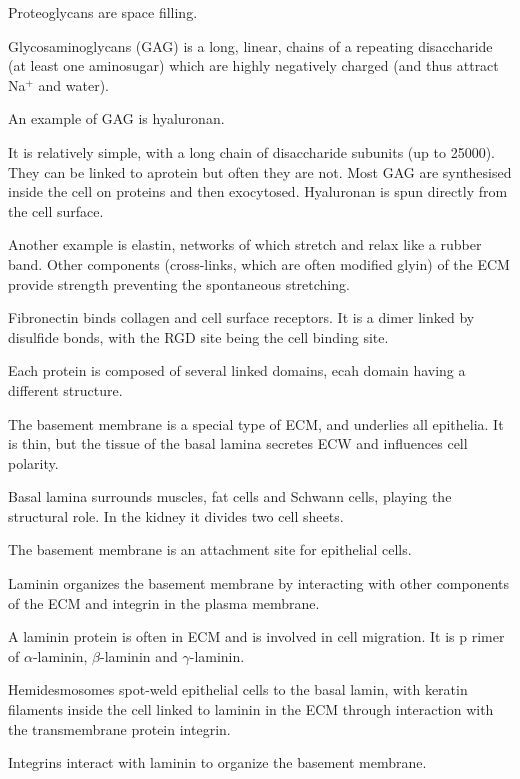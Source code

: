 \documentclass[11pt]{scrartcl}
\begin{document}
Proteoglycans are space filling. 

Glycosaminoglycans (GAG) is a long, linear, chains of a repeating
disaccharide (at least one aminosugar) which are highly negatively
charged (and thus attract Na$^+$ and water).

An example of GAG is hyaluronan. 

It is relatively simple, with a long chain of disaccharide subunits (up to 25000). They can be linked to aprotein but often they are not. Most GAG are synthesised inside the cell on proteins and then exocytosed. Hyaluronan is spun directly from the cell surface.

Another example is elastin, networks of which stretch and relax like a rubber band. Other components (cross-links, which are often modified glyin) of the ECM provide strength preventing the spontaneous stretching.

Fibronectin binds collagen and cell surface receptors. It is a dimer linked by disulfide bonds, with the RGD site being the cell binding site.

Each protein is composed of several linked domains, ecah domain having a different structure.

The basement membrane is a special type of ECM, and underlies all
epithelia. It is thin, but the tissue of the basal lamina secretes ECW
and influences cell polarity.

Basal lamina surrounds muscles, fat cells and Schwann cells, playing the structural role. In the kidney it divides two cell sheets.

The basement membrane is an attachment site for epithelial cells.

Laminin organizes the basement membrane by interacting with other
components of the ECM and integrin in the plasma membrane.

A laminin protein is often in ECM and is involved in cell migration. It is p rimer of $\alpha$-laminin, $\beta$-laminin and $\gamma$-laminin. 

Hemidesmosomes spot-weld epithelial cells to the basal lamin, with keratin filaments inside the cell linked to laminin in the ECM through interaction with the transmembrane protein integrin.

Integrins interact with laminin to organize the basement membrane.
\end{document}
